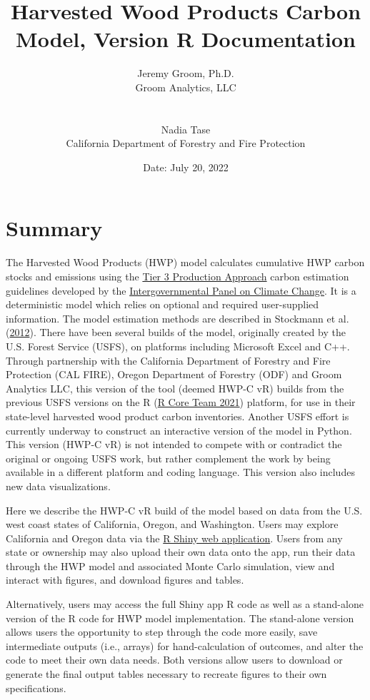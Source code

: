 \documentclass[
  openany]{book}
\title{Harvested Wood Products Carbon Model, Version R Documentation}
\author{Jeremy Groom, Ph.D.\\
Groom Analytics, LLC\\
\strut \\
Nadia Tase\\
California Department of Forestry and Fire Protection}
\date{Date: July 20, 2022}
\begin{document}
\frontmatter
\maketitle

\mainmatter
\hypertarget{sum}{%
\chapter{Summary}\label{sum}}

The Harvested Wood Products (HWP) model calculates cumulative HWP carbon
stocks and emissions using the
\href{https://www.ipcc-nggip.iges.or.jp/public/2006gl/pdf/4_Volume4/V4_04_Ch4_Forest_Land.pdf}{Tier
3 Production Approach} carbon estimation guidelines developed by the
\href{https://www.ipcc.ch/}{Intergovernmental Panel on Climate Change}.
It is a deterministic model which relies on optional and required
user-supplied information. The model estimation methods are described in
Stockmann et al. (\protect\hyperlink{ref-stockmann2012}{2012}). There
have been several builds of the model, originally created by the U.S.
Forest Service (USFS), on platforms including Microsoft Excel and C++.
Through partnership with the California Department of Forestry and Fire
Protection (CAL FIRE), Oregon Department of Forestry (ODF) and Groom
Analytics LLC, this version of the tool (deemed HWP-C vR) builds from
the previous USFS versions on the R (\protect\hyperlink{ref-R-base}{R
Core Team 2021}) platform, for use in their state-level harvested wood
product carbon inventories. Another USFS effort is currently underway to
construct an interactive version of the model in Python. This version
(HWP-C vR) is not intended to compete with or contradict the original or
ongoing USFS work, but rather complement the work by being available in
a different platform and coding language. This version also includes new
data visualizations.

Here we describe the HWP-C vR build of the model based on data from the
U.S. west coast states of California, Oregon, and Washington. Users may
explore California and Oregon data via the
\href{https://groomanalyticsllc.shinyapps.io/HWP-C-vR/}{R Shiny web
application}. Users from any state or ownership may also upload their
own data onto the app, run their data through the HWP model and
associated Monte Carlo simulation, view and interact with figures, and
download figures and tables.

Alternatively, users may access the full Shiny app R code as well as a
stand-alone version of the R code for HWP model implementation. The
stand-alone version allows users the opportunity to step through the
code more easily, save intermediate outputs (i.e., arrays) for
hand-calculation of outcomes, and alter the code to meet their own data
needs. Both versions allow users to download or generate the final
output tables necessary to recreate figures to their own specifications.
\end{document}
